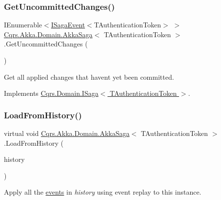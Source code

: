 \subsubsection{\texorpdfstring{Get\+Uncommitted\+Changes()}{GetUncommittedChanges()}}
{\footnotesize\ttfamily I\+Enumerable$<$\hyperlink{interfaceCqrs_1_1Events_1_1ISagaEvent}{I\+Saga\+Event}$<$T\+Authentication\+Token$>$ $>$ \hyperlink{classCqrs_1_1Akka_1_1Domain_1_1AkkaSaga}{Cqrs.\+Akka.\+Domain.\+Akka\+Saga}$<$ T\+Authentication\+Token $>$.Get\+Uncommitted\+Changes (\begin{DoxyParamCaption}{ }\end{DoxyParamCaption})}



Get all applied changes that haven\textquotesingle{}t yet been committed. 



Implements \hyperlink{interfaceCqrs_1_1Domain_1_1ISaga_abb77811b4f7d19adb61f9d33da18e7e0_abb77811b4f7d19adb61f9d33da18e7e0}{Cqrs.\+Domain.\+I\+Saga$<$ T\+Authentication\+Token $>$}.

\mbox{\label{classCqrs_1_1Akka_1_1Domain_1_1AkkaSaga_a40b859bc15c2f7c87a21b07f9bc9548c_a40b859bc15c2f7c87a21b07f9bc9548c}} 
\subsubsection{\texorpdfstring{Load\+From\+History()}{LoadFromHistory()}}
{\footnotesize\ttfamily virtual void \hyperlink{classCqrs_1_1Akka_1_1Domain_1_1AkkaSaga}{Cqrs.\+Akka.\+Domain.\+Akka\+Saga}$<$ T\+Authentication\+Token $>$.Load\+From\+History (\begin{DoxyParamCaption}\item[{I\+Enumerable$<$ \hyperlink{interfaceCqrs_1_1Events_1_1ISagaEvent}{I\+Saga\+Event}$<$ T\+Authentication\+Token $>$$>$}]{history }\end{DoxyParamCaption})\hspace{0.3cm}{\ttfamily [virtual]}}



Apply all the \hyperlink{}{events} in {\itshape history}  using event replay to this instance. 



